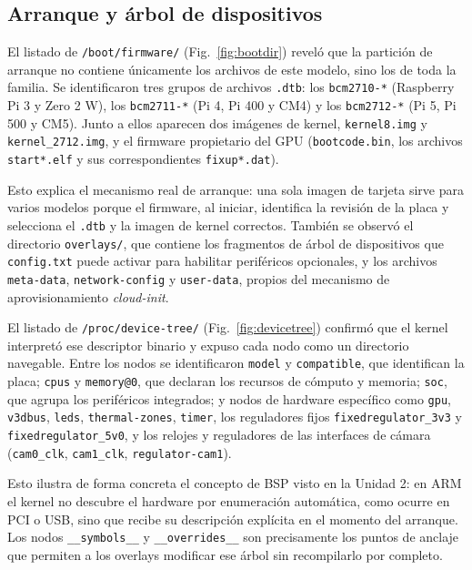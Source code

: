 \documentclass[conference]{IEEEtran}
\begin{document}
\subsection{Arranque y árbol de dispositivos}
El listado de \texttt{/boot/firmware/} (Fig.~\ref{fig:bootdir}) reveló que la partición de arranque no contiene únicamente los archivos de este modelo, sino los de toda la familia. Se identificaron tres grupos de archivos \texttt{.dtb}: los \texttt{bcm2710-*} (Raspberry Pi 3 y Zero 2 W), los \texttt{bcm2711-*} (Pi 4, Pi 400 y CM4) y los \texttt{bcm2712-*} (Pi 5, Pi 500 y CM5). Junto a ellos aparecen dos imágenes de kernel, \texttt{kernel8.img} y \texttt{kernel\_2712.img}, y el firmware propietario del GPU (\texttt{bootcode.bin}, los archivos \texttt{start*.elf} y sus correspondientes \texttt{fixup*.dat}).

Esto explica el mecanismo real de arranque: una sola imagen de tarjeta sirve para varios modelos porque el firmware, al iniciar, identifica la revisión de la placa y selecciona el \texttt{.dtb} y la imagen de kernel correctos. También se observó el directorio \texttt{overlays/}, que contiene los fragmentos de árbol de dispositivos que \texttt{config.txt} puede activar para habilitar periféricos opcionales, y los archivos \texttt{meta-data}, \texttt{network-config} y \texttt{user-data}, propios del mecanismo de aprovisionamiento \textit{cloud-init}.

El listado de \texttt{/proc/device-tree/} (Fig.~\ref{fig:devicetree}) confirmó que el kernel interpretó ese descriptor binario y expuso cada nodo como un directorio navegable. Entre los nodos se identificaron \texttt{model} y \texttt{compatible}, que identifican la placa; \texttt{cpus} y \texttt{memory@0}, que declaran los recursos de cómputo y memoria; \texttt{soc}, que agrupa los periféricos integrados; y nodos de hardware específico como \texttt{gpu}, \texttt{v3dbus}, \texttt{leds}, \texttt{thermal-zones}, \texttt{timer}, los reguladores fijos \texttt{fixedregulator\_3v3} y \texttt{fixedregulator\_5v0}, y los relojes y reguladores de las interfaces de cámara (\texttt{cam0\_clk}, \texttt{cam1\_clk}, \texttt{regulator-cam1}).

Esto ilustra de forma concreta el concepto de BSP visto en la Unidad 2: en ARM el kernel no descubre el hardware por enumeración automática, como ocurre en PCI o USB, sino que recibe su descripción explícita en el momento del arranque. Los nodos \texttt{\_\_symbols\_\_} y \texttt{\_\_overrides\_\_} son precisamente los puntos de anclaje que permiten a los overlays modificar ese árbol sin recompilarlo por completo.
\end{document}
